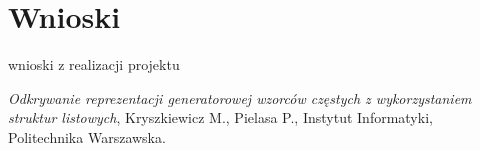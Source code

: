 \documentclass[a4paper,10pt]{article}
\begin{document}
\section*{Wnioski}
wnioski z realizacji projektu



\begin{thebibliography}{*}

  \emph{Odkrywanie reprezentacji generatorowej wzorców częstych z wykorzystaniem struktur listowych},
  Kryszkiewicz M., Pielasa P.,
  Instytut Informatyki,
  Politechnika Warszawska.


\end{thebibliography}
\end{document}
